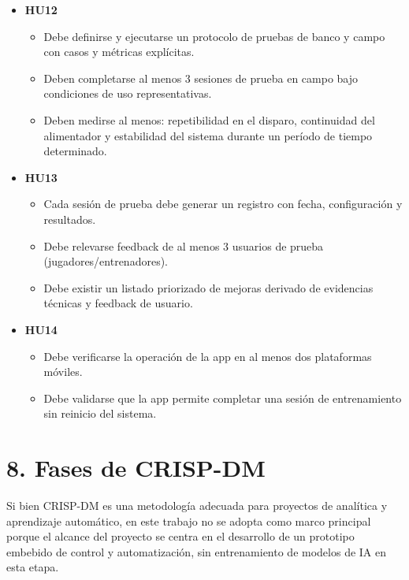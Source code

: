 ﻿\documentclass[
11pt, %
]{charter}
\begin{document}
\begin{itemize}
\begin{itemize}
      \item \textbf{HU12}
      \begin{itemize}
        \item Debe definirse y ejecutarse un protocolo de pruebas de banco y campo con casos y métricas explícitas.
        \item Deben completarse al menos 3 sesiones de prueba en campo bajo condiciones de uso representativas.
        \item Deben medirse al menos: repetibilidad en el disparo, continuidad del alimentador y estabilidad del sistema durante un período de tiempo determinado.
      \end{itemize}
      \item \textbf{HU13}
      \begin{itemize}
        \item Cada sesión de prueba debe generar un registro con fecha, configuración y resultados.
        \item Debe relevarse feedback de al menos 3 usuarios de prueba (jugadores/entrenadores).
        \item Debe existir un listado priorizado de mejoras derivado de evidencias técnicas y feedback de usuario.
      \end{itemize}
      \item \textbf{HU14}
      \begin{itemize}
        \item Debe verificarse la operación de la app en al menos dos plataformas móviles.
        \item Debe validarse que la app permite completar una sesión de entrenamiento sin reinicio del sistema.
      \end{itemize}
    \end{itemize}
\end{itemize}

\newpage
\section{8. Fases de CRISP-DM}

Si bien CRISP-DM es una metodología adecuada para proyectos de analítica y aprendizaje automático, en este trabajo no se adopta como marco principal porque el alcance del proyecto se centra en el desarrollo de un prototipo embebido de control y automatización, sin entrenamiento de modelos de IA en esta etapa.
\end{document}
